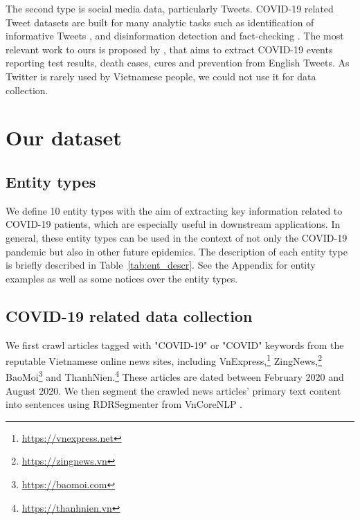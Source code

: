 \documentclass[11pt]{article}
\begin{document}
The second type is social media data, particularly Tweets. COVID-19 related Tweet datasets are built for many analytic tasks such as identification of informative Tweets \cite{nguyen2020wnut}, and disinformation  detection and fact-checking \cite{FakeCovid,alam2020fighting,alsudias-rayson-2020-covid}. 
The most relevant work to ours is proposed by \citet{zong2020extracting}, that aims to extract COVID-19 events reporting test results, death cases, cures and prevention from English Tweets. As Twitter is rarely used by Vietnamese people, we could not use it for data collection. 



 

\section{Our dataset}
\label{dataset}



\subsection{Entity types}

We define 10 entity types with the aim of extracting key information related to COVID-19 patients, which are especially useful in downstream applications. In general, these entity types can be used in the context of not only the COVID-19 pandemic but also in other future epidemics. The description of each entity type is briefly described in Table~\ref{tab:ent_descr}. See the Appendix for entity examples as well as some notices over the entity types. 


\subsection{COVID-19 related data collection}
\label{section_datacollection}




We first crawl articles tagged with "COVID-19" or "COVID" keywords from the reputable Vietnamese online news sites, including VnExpress,\footnote{\url{https://vnexpress.net}} ZingNews,\footnote{\url{https://zingnews.vn}} BaoMoi\footnote{\url{https://baomoi.com}} and ThanhNien.\footnote{\url{https://thanhnien.vn}} These articles are dated between February 2020 
and August 2020.  
We then segment the crawled news articles' primary text content into sentences using RDRSegmenter \cite{NguyenNVDJ2018} from VnCoreNLP \cite{vu-etal-2018-vncorenlp}.  
\end{document}
